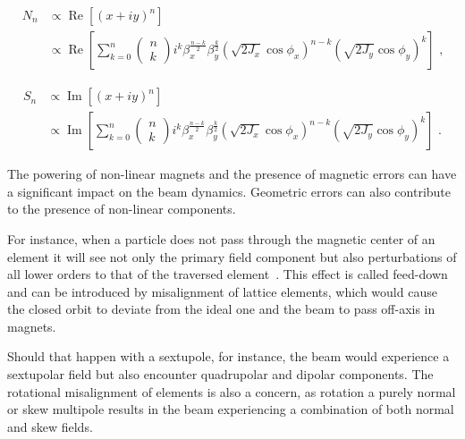 \begin{equation}
    \begin{aligned}
        N_n & \propto \operatorname{Re} \left[(x + i y)^n \right] \\
            & \propto \operatorname{Re} \left[ \sum_{k=0}^n \left(
                \begin{array}{l}
                    n \\
                    k
                \end{array} \right) 
            i^k \beta_x^{\frac{n-k}{2}} \beta_y^{\frac{k}{2}} \left(\sqrt{2 J_x} \cos \phi_x \right)^{n-k} \left( \sqrt{2 J_y} \cos \phi_y \right)^k \right] \text{ ,}
    \end{aligned}
    \label{equation:hamiltonian_prop_normal_multipoles}
\end{equation}

\begin{equation}
    \begin{aligned}
        S_n & \propto \operatorname{Im} \left[(x + i y)^n \right] \\
            & \propto \operatorname{Im} \left[ \sum_{k=0}^n \left(
                \begin{array}{l}
                    n \\
                    k
                \end{array} \right) 
            i^k \beta_x^{\frac{n-k}{2}} \beta_y^{\frac{k}{2}} \left(\sqrt{2 J_x} \cos \phi_x \right)^{n-k} \left( \sqrt{2 J_y} \cos \phi_y \right)^k \right] \text{ .}
    \end{aligned}
    \label{equation:hamiltonian_prop_skew_multipoles}
\end{equation}

The powering of non-linear magnets and the presence of magnetic errors can have a significant impact on the beam dynamics.
Geometric errors can also contribute to the presence of non-linear components.

For instance, when a particle does not pass through the magnetic center of an element it will see not only the primary field component but also perturbations of all lower orders to that of the traversed element~\cite{BOOK:Wiedemann:Particle_Accelerator_Physics}.
This effect is called \gls{feed-down} and can be introduced by misalignment of lattice elements, which would cause the closed orbit to deviate from the ideal one and the beam to pass off-axis in magnets.

Should that happen with a sextupole, for instance, the beam would experience a sextupolar field but also encounter quadrupolar and dipolar components.
The rotational misalignment of elements is also a concern, as rotation a purely normal or skew multipole results in the beam experiencing a combination of both normal and skew fields.


